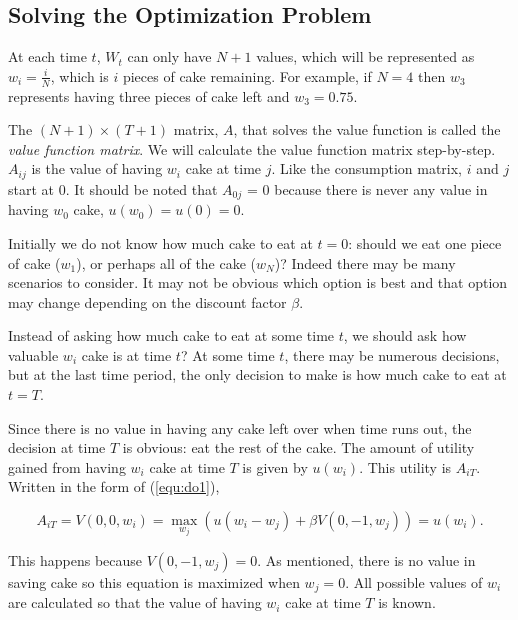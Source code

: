 \pagebreak[1]

\subsection*{Solving the Optimization Problem}

At each time $t$, $W_t$ can only have $N+1$ values, which will be represented as $w_i = \frac{i}{N}$, which is $i$ pieces of cake remaining.
For example, if $N=4$ then $w_3$ represents having three pieces of cake left and $w_3 = 0.75$.

The $(N+1) \times (T+1)$ matrix, $A$, that solves the value function is called the \emph{value function matrix}.
We will calculate the value function matrix step-by-step.
$A_{ij}$ is the value of having $w_i$ cake at time $j$.
Like the consumption matrix, $i$ and $j$ start at $0$.
It should be noted that $A_{0j}$ = 0 because there is never any value in having $w_0$ cake, $u(w_0) = u(0) = 0$.

Initially we do not know how much cake to eat at $t = 0$: should we eat one piece of cake ($w_1$), or perhaps all of the cake ($w_N$)?
Indeed there may be many scenarios to consider.
It may not be obvious which option is best and that option may change depending on the discount factor $\beta$.

Instead of asking how much cake to eat at some time $t$, we should ask how valuable $w_i$ cake is at time $t$?
At some time $t$, there may be numerous decisions, but at the last time period, the only decision to make is how much cake to eat at $t=T$.

Since there is no value in having any cake left over when time runs out, the decision at time $T$ is obvious: eat the rest of the cake.
The amount of utility gained from having $w_i$ cake at time $T$ is given by $u(w_i)$.
This utility is $A_{iT}$.
Written in the form of (\ref{equ:do1}),

\begin{equation}\label{equ:do2}
A_{iT} = V(0, 0, w_{i}) = \max_{w_{j}} \left(u(w_{i} - w_{j}) + \beta V(0, -1, w_{j})\right) = u(w_{i}).
\end{equation}

This happens because $V(0,-1,w_j) = 0$.
As mentioned, there is no value in saving cake so this equation is maximized when $w_j = 0$.
All possible values of $w_{i}$ are calculated so that the value of having $w_i$ cake at time $T$ is known.

